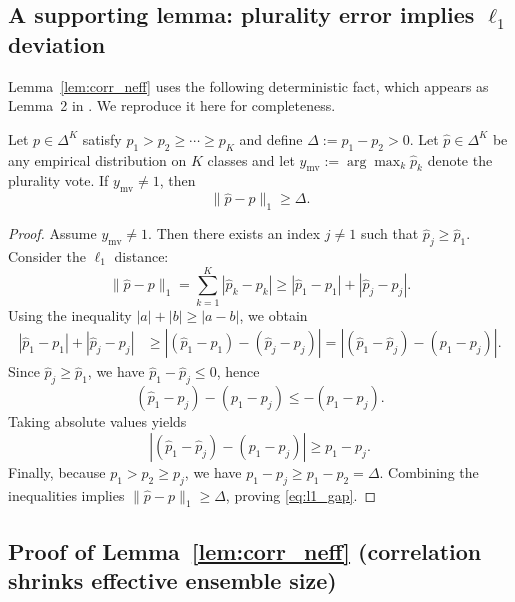 \subsection{A supporting lemma: plurality error implies $\ell_1$ deviation}
\label{app:lemma_L1}

Lemma~\ref{lem:corr_neff} uses the following deterministic fact, which appears as Lemma~2 in \citet{choi2025debate}.
We reproduce it here for completeness.

\begin{lemma}
\label{lem:mv_implies_l1}
Let \(p\in\Delta^K\) satisfy \(p_1>p_2\ge \cdots \ge p_K\) and define \(\Delta:=p_1-p_2>0\).
Let \(\hat p\in\Delta^K\) be any empirical distribution on \(K\) classes and let
\(y_{\mathrm{mv}}:=\arg\max_k \hat p_k\) denote the plurality vote.
If \(y_{\mathrm{mv}}\neq 1\), then
\begin{equation}
\|\hat p-p\|_1 \ge \Delta.
\label{eq:l1_gap}
\end{equation}
\end{lemma}

\begin{proof}
Assume \(y_{\mathrm{mv}}\neq 1\). Then there exists an index \(j\neq 1\) such that
\(\hat p_j\ge \hat p_1\). Consider the \(\ell_1\) distance:
\[
\|\hat p-p\|_1 = \sum_{k=1}^K |\hat p_k-p_k| \ge |\hat p_1-p_1| + |\hat p_j-p_j|.
\]
Using the inequality \(|a|+|b|\ge |a-b|\), we obtain
\begin{align}
|\hat p_1-p_1| + |\hat p_j-p_j|
&\ge |(\hat p_1-p_1) - (\hat p_j-p_j)|
= |(\hat p_1-\hat p_j) - (p_1-p_j)|.
\label{eq:ab_ineq}
\end{align}
Since \(\hat p_j\ge \hat p_1\), we have \(\hat p_1-\hat p_j\le 0\), hence
\[
(\hat p_1-\hat p_j) - (p_1-p_j) \le -(p_1-p_j).
\]
Taking absolute values yields
\[
|(\hat p_1-\hat p_j) - (p_1-p_j)| \ge p_1-p_j.
\]
Finally, because \(p_1>p_2\ge p_j\), we have \(p_1-p_j\ge p_1-p_2=\Delta\).
Combining the inequalities implies \(\|\hat p-p\|_1\ge \Delta\), proving \eqref{eq:l1_gap}.
\end{proof}

\subsection{Proof of Lemma~\ref{lem:corr_neff} (correlation shrinks effective ensemble size)}
\label{app:proof_corr}

